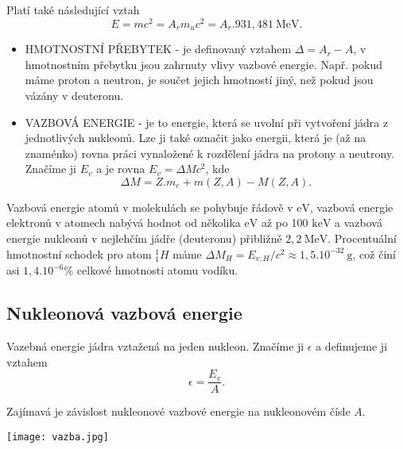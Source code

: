 \documentclass[../../main.tex]{subfiles}
\begin{document}
Platí také následující vztah
\begin{equation}
E = mc^2 = A_r m_u c^2 = A_r . 931,481 ~\mathrm{MeV}.
\end{equation} 
\begin{itemize}
	\item HMOTNOSTNÍ PŘEBYTEK - je definovaný vztahem $\Delta = A_r - A$, v hmotnostním přebytku jsou zahrnuty vlivy vazbové energie. Např. pokud máme proton a neutron, je součet jejich hmotností jiný, než pokud jsou vázány v deuteronu. 
	\item VAZBOVÁ ENERGIE - je to energie, která se uvolní při vytvoření jádra z jednotlivých nukleonů. Lze ji také označit jako energii, která je (až na znaménko) rovna práci vynaložené k rozdělení jádra na protony a neutrony. Značíme ji $E_v$ a je rovna $E_v = \Delta M c^2$, kde 
\begin{equation}
\Delta M = Z.m_e + m(Z,A) - M(Z,A).
\end{equation}	 
\end{itemize}
Vazbová energie atomů v molekulách se pohybuje řádově v $\mathrm{eV}$, vazbová energie elektronů v atomech nabývá hodnot od několika $\mathrm{eV}$ až po 100 $\mathrm{keV}$ a vazbová energie nukleonů v nejlehčím jádře (deuteronu) přibližně $2,2 ~\mathrm{MeV}$. Procentuální hmotnostní schodek pro atom $^{1}_{1}H$ máme $\Delta M_H = E_{v, H}/c^2 \approx 1,5.10^{-32} ~\mathrm{g}$, což činí asi $1,4.10^{-6} \%$ celkové hmotnosti atomu vodíku.

\subsection{Nukleonová vazbová energie}

Vazebná energie jádra vztažená na jeden nukleon. Značíme ji $\epsilon$ a definujeme ji vztahem
\begin{equation}
\epsilon = \dfrac{E_v}{A}.
\end{equation}

Zajímavá je závislost nukleonové vazbové energie na nukleonovém čísle $A$. 


\begin{center}
	\texttt{[image: vazba.jpg]}
\end{center}
\end{document}
